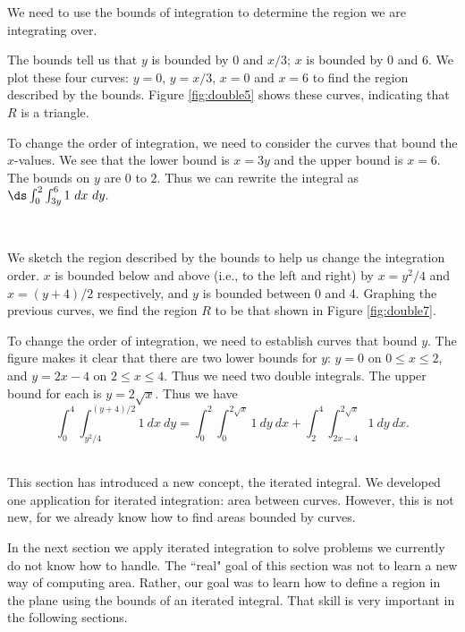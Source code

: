 {We need to use the bounds of integration to determine the region we are integrating over. %

The bounds tell us that $y$ is bounded by $0$ and $x/3$; $x$ is bounded by 0 and 6. We plot these four curves: $y=0$, $y=x/3$, $x=0$ and $x=6$ to find the region described by the bounds. Figure \ref{fig:double5} shows these curves, indicating that $R$ is a triangle.
\enlargethispage{\baselineskip}

To change the order of integration, we need to consider the curves that bound the $x$-values. We see that the lower bound is $x=3y$ and the upper bound is $x=6$. The bounds on $y$ are $0$ to $2$. Thus we can rewrite the integral as 
$\ds \int_0^2\int_{3y}^6 1\ dx \ dy.$
\vskip 0pt
}\\

{We sketch the region described by the bounds to help us change the integration order. $x$ is bounded below and above (i.e., to the left and right) by $x=y^2/4$ and $x=(y+4)/2$ respectively, and $y$ is bounded between 0 and 4. Graphing the previous curves, we find the region $R$ to be that shown in Figure \ref{fig:double7}. 

To change the order of integration, we need to establish curves that bound $y$. The figure makes it clear that there are two lower bounds for $y$: $y=0$ on $0\leq x\leq 2$, and $y=2x-4$ on $2\leq x\leq 4$. Thus we need two double integrals. The upper bound for each is $y=2\sqrt{x}$. Thus we have
$$\int_0^4\int_{y^2/4}^{(y+4)/2}1\ dx\ dy = \int_0^2\int_0^{2\sqrt{x}} 1\ dy\ dx + \int_2^4\int_{2x-4}^{2\sqrt{x}}1\ dy\ dx.$$
}\\

This section has introduced a new concept, the iterated integral. We developed one application for iterated integration: area between curves. However, this is not new, for we already know how to find areas bounded by curves.

In the next section we apply iterated integration to solve problems we currently do not know how to handle. The ``real" goal of this section was not to learn a new way of computing area. Rather, our goal was to learn how to define a region in the plane using the bounds of an iterated integral. That skill is very important in the following sections.

